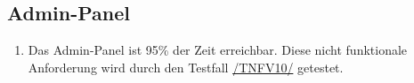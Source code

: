 \subsection*{Admin-Panel}

\begin{samepage}
    \begin{enumerate}[label=\textbf{/NFV\arabic*0/}, align=left]
        \item \label{/NFV10/} Das \Gls{Admin-Panel} ist 95\% der Zeit erreichbar. Diese nicht funktionale Anforderung wird durch den Testfall \hyperref[/TNFV10/]{/TNFV10/} getestet.
    \end{enumerate}
\end{samepage}
